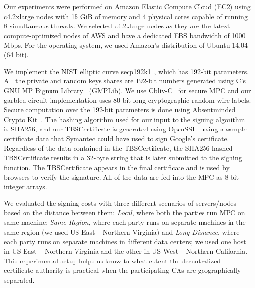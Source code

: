  Our experiments were performed on Amazon Elastic Compute Cloud (EC2) using c4.2xlarge nodes with 15 GiB of memory and 4 physical cores capable of running 8 simultaneous threads.  We selected c4.2xlarge nodes as they are the latest compute-optimized nodes of AWS and have a dedicated EBS bandwidth of 1000 Mbps. %
For the operating system, we used Amazon's distribution of Ubuntu 14.04 (64 bit).  %
 
We implement the NIST elliptic curve secp192k1~\cite{elliptic_curve_domain_parameters}, which has 192-bit parameters. All the private and random keys shares are 192-bit numbers generated using C's GNU MP Bignum Library~\cite{libgmp} (GMPLib). We use Obliv-C~\cite{cryptoeprint:2015:1153} for secure MPC and our garbled circuit implementation uses 80-bit long cryptographic random wire labels. Secure computation over the 192-bit parameters is done using Absentminded Crypto Kit~\cite{absentminded_crypto_kit}. The hashing algorithm used for our input to the signing algorithm is SHA256, and our TBSCertificate is generated using OpenSSL~\cite{openssl} using a sample certificate data that Symantec could have used to sign Google's certificate. Regardless of the data contained in the TBSCertificate, the SHA256 hashed TBSCertificate results in a 32-byte string that is later submitted to the signing function. The TBSCertificate appears in the final certificate and is used by browsers to verify the signature. All of the data are fed into the MPC as 8-bit integer arrays.

We evaluated the signing costs with three different scenarios of servers/nodes based on the distance between them: \emph{Local}, where both the parties run MPC on same machine; \emph{Same Region}, where each party runs on separate machines in the same region (we used US East -- Northern Virginia) and \emph{Long Distance}, where each party runs on separate machines in different data centers; we used one host in US East -- Northern Virginia and the other in US West -- Northern California. This experimental setup helps us know to what extent the decentralized certificate authority is practical when the participating CAs are geographically separated.

